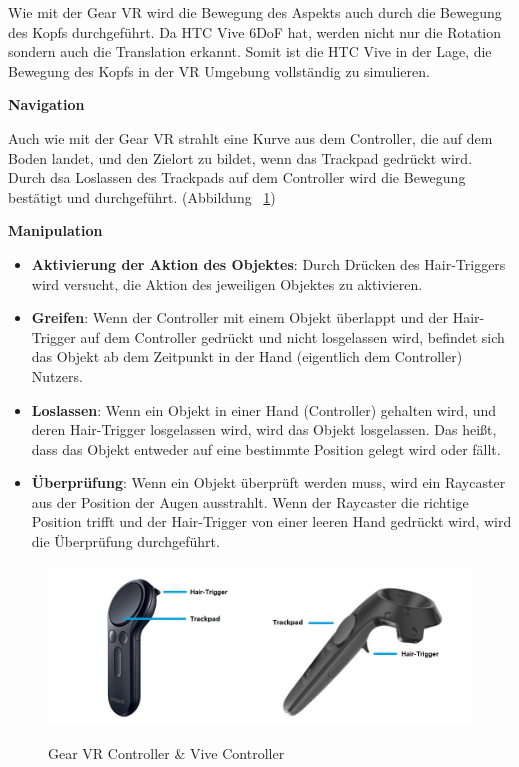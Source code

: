   \noindent
  Wie mit der Gear VR wird die Bewegung des Aspekts auch durch die Bewegung des Kopfs durchgeführt. Da HTC Vive 6DoF hat, werden nicht nur die Rotation sondern auch die Translation erkannt. Somit ist die HTC Vive in der Lage, die Bewegung des Kopfs in der VR Umgebung vollständig zu simulieren.
  
  \vspace{1em}
  \noindent
  \textbf{Navigation}
  \vspace{1em}
  
  \noindent
  Auch wie mit der Gear VR strahlt eine Kurve aus dem Controller, die auf dem Boden landet, und den Zielort zu bildet, wenn das Trackpad gedrückt wird. Durch dsa Loslassen des Trackpads auf dem Controller wird die Bewegung bestätigt und durchgeführt. (Abbildung ~\ref{fig:gearViveController})
  
  \vspace{1em}
  \noindent
  \textbf{Manipulation}
  \vspace{1em}
  
  \begin{itemize}
  \item \textbf{Aktivierung der Aktion des Objektes}: Durch Drücken des Hair-Triggers wird versucht, die Aktion des jeweiligen Objektes zu aktivieren.
  \item \textbf{Greifen}: Wenn der Controller mit einem Objekt überlappt und der Hair-Trigger auf dem Controller gedrückt und nicht losgelassen wird, befindet sich das Objekt ab dem Zeitpunkt in der Hand (eigentlich dem Controller) Nutzers.
  \item \textbf{Loslassen}: Wenn ein Objekt in einer Hand (Controller) gehalten wird, und deren Hair-Trigger losgelassen wird, wird das Objekt losgelassen. Das heißt, dass das Objekt entweder auf eine bestimmte Position gelegt wird oder fällt.
  \item \textbf{Überprüfung}: Wenn ein Objekt überprüft werden muss, wird ein Raycaster aus der Position der Augen ausstrahlt. Wenn der Raycaster die richtige Position trifft und der Hair-Trigger von einer leeren Hand gedrückt wird, wird die Überprüfung durchgeführt.
  \end{itemize}

\begin{figure}[ht]
\vspace*{1em}
\centering
\caption{Gear VR Controller \& Vive Controller}
\includegraphics[width=\textwidth]{images/gearViveController.png}
\label{fig:gearViveController} 
\end{figure}
  
